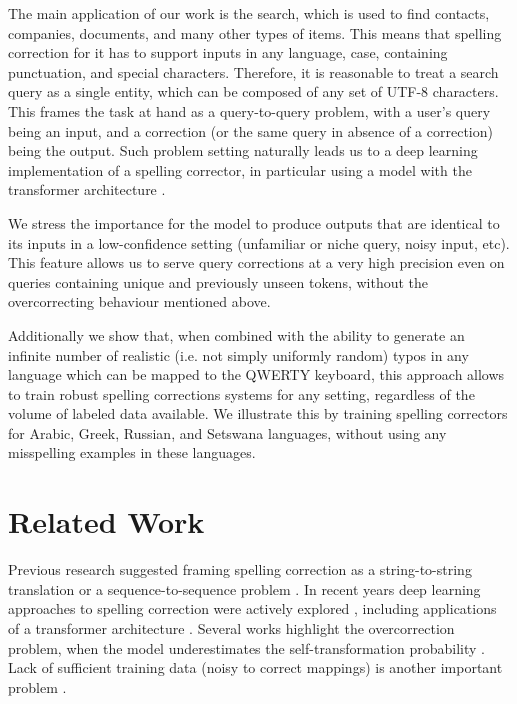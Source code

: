 \documentclass[11pt,a4paper]{article}
\begin{document}
The main application of our work is the {\fi} search, which is used to find contacts, companies, documents, and many other types of items. This means that spelling correction for it has to support inputs in any language, case, containing punctuation, and special characters. Therefore, it is reasonable to treat a search query as a single entity, which can be composed of any set of UTF-8 characters. This frames the task at hand as a query-to-query problem, with a user’s query being an input, and a correction (or the same query in absence of a correction) being the output. Such problem setting naturally leads us to a deep learning implementation of a spelling corrector, in particular using a model with the transformer architecture \cite{vaswani2017attention}.

We stress the importance for the model to produce outputs that are identical to its inputs in a low-confidence setting (unfamiliar or niche query, noisy input, etc). This feature allows us to serve query corrections at a very high precision even on queries containing unique and previously unseen tokens, without the overcorrecting behaviour mentioned above.

Additionally we show that, when combined with the ability to generate an infinite number of realistic (i.e. not simply uniformly random) typos in any language which can be mapped to the QWERTY keyboard, this approach allows to train robust spelling corrections systems for any setting, regardless of the volume of labeled data available. We illustrate this by training spelling correctors for Arabic, Greek, Russian, and Setswana languages, without using any misspelling examples in these languages.


\section{Related Work}

Previous research suggested framing spelling correction as a string-to-string translation or a sequence-to-sequence problem \cite{hasan2015spelling,eger2016comparison,zhou2017spelling,movin2018spelling,wang2019confusionset,zhang2019investigation}. In recent years deep learning approaches to spelling correction were actively explored \cite{sun2015convolutional,zhou2017spelling,ghosh2017neural,etoori2018automatic,li-etal-2018-hybrid,movin2018spelling}, including applications \cite{zhang2019investigation,grundkiewicz2019neural} of a transformer architecture \cite{vaswani2017attention}. Several works highlight the overcorrection problem, when the model underestimates the self-transformation probability \cite{sun2010learning,Zhu2019}. Lack of sufficient training data (noisy to correct mappings) is another important problem \cite{ghosh2017neural}.
\end{document}
